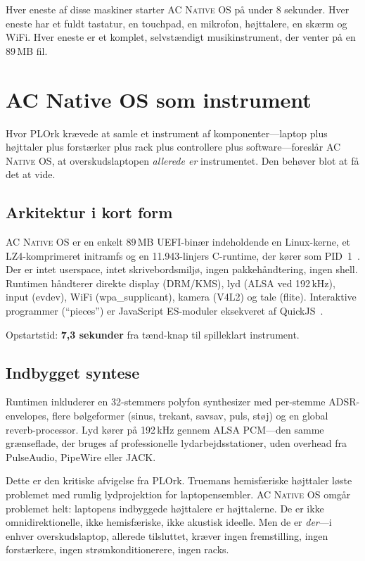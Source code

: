 \documentclass[10pt,letterpaper,twocolumn]{article}
\newcommand{\acos}{\textsc{AC Native OS}}
\begin{document}
Hver eneste af disse maskiner starter \acos{} p{\aa} under 8 sekunder. Hver eneste har et fuldt tastatur, en touchpad, en mikrofon, h{\o}jttalere, en sk{\ae}rm og WiFi. Hver eneste er et komplet, selvst{\ae}ndigt musikinstrument, der venter p{\aa} en 89\,MB fil.


\section{AC Native OS som instrument}
\label{sec:instrument}

Hvor PLOrk kr{\ae}vede at samle et instrument af komponenter---laptop plus h{\o}jttaler plus forst{\ae}rker plus rack plus controllere plus software---foresl{\aa}r \acos{}, at overskudslaptopen \emph{allerede er} instrumentet. Den beh{\o}ver blot at f{\aa} det at vide.

\subsection{Arkitektur i kort form}

\acos{} er en enkelt 89\,MB UEFI-bin{\ae}r indeholdende en Linux-kerne, et LZ4-komprimeret initramfs og en 11.943-linjers C-runtime, der k{\o}rer som PID~1~\citep{scudder2026os}. Der er intet userspace, intet skrivebordsmilj{\o}, ingen pakkeh{\aa}ndtering, ingen shell. Runtimen h{\aa}ndterer direkte display (DRM/KMS), lyd (ALSA ved 192\,kHz), input (evdev), WiFi (wpa\_supplicant), kamera (V4L2) og tale (flite). Interaktive programmer (``pieces'') er JavaScript ES-moduler eksekveret af QuickJS~\citep{bellard2019quickjs}.

Opstartstid: \textbf{7,3 sekunder} fra tænd-knap til spilleklart instrument.

\subsection{Indbygget syntese}

Runtimen inkluderer en 32-stemmers polyfon synthesizer med per-stemme ADSR-envelopes, flere b{\o}lgeformer (sinus, trekant, savsav, puls, st{\o}j) og en global reverb-processor. Lyd k{\o}rer p{\aa} 192\,kHz gennem ALSA PCM---den samme gr{\ae}nseflade, der bruges af professionelle lydarbejdsstationer, uden overhead fra PulseAudio, PipeWire eller JACK.

Dette er den kritiske afvigelse fra PLOrk. Truemans hemisf{\ae}riske h{\o}jttaler l{\o}ste problemet med rumlig lydprojektion for laptopensembler. \acos{} omg{\aa}r problemet helt: laptopens indbyggede h{\o}jttalere er h{\o}jttalerne. De er ikke omnidirektionelle, ikke hemisf{\ae}riske, ikke akustisk ideelle. Men de er \emph{der}---i enhver overskudslaptop, allerede tilsluttet, kr{\ae}ver ingen fremstilling, ingen forst{\ae}rkere, ingen str{\o}mkonditionerere, ingen racks.
\end{document}
